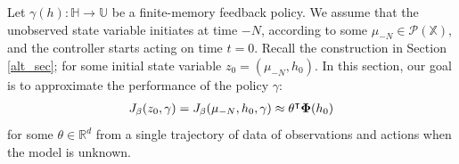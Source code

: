 \documentclass[letterpaper, 10 pt, conference]{ieeeconf}  %
\def\P{{\mathcal P}}
\theoremstyle{definition}
\theoremstyle{remark}
\begin{document}
Let $\gamma(h):\mathds{H}\to \mathds{U}$ be a finite-memory feedback policy.  We assume that the unobserved state variable initiates at time $-N$, according to some $\mu_{-N}\in\P(\mathds{X})$, and the controller starts acting on time $t=0$. Recall the construction in Section \ref{alt_sec}; for some initial state variable $z_0=(\mu_{-N}, h_0)$.%
In this section, our goal is to approximate the performance of the policy $\gamma$:
\begin{align*}
J_\beta(z_0,\gamma)= J_\beta(\mu_{-N},h_0,\gamma)\approx \theta^\intercal {\bf \Phi}(h_0)
\end{align*}
for some $\theta\in \mathds{R}^d$ from a single trajectory of data of observations and actions when the model is unknown.
\end{document}
